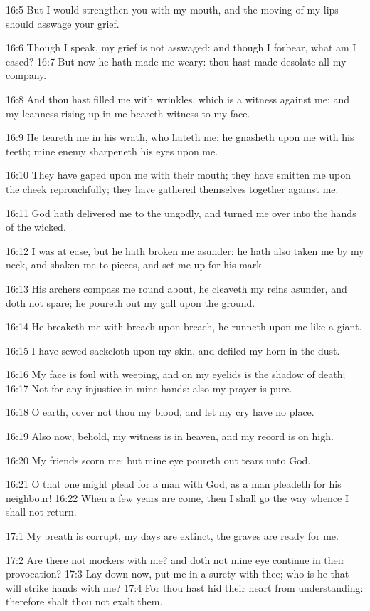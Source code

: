 16:5 But I would strengthen you with my mouth, and the moving of my
lips should asswage your grief.

16:6 Though I speak, my grief is not asswaged: and though I forbear,
what am I eased?  16:7 But now he hath made me weary: thou hast made
desolate all my company.

16:8 And thou hast filled me with wrinkles, which is a witness against
me: and my leanness rising up in me beareth witness to my face.

16:9 He teareth me in his wrath, who hateth me: he gnasheth upon me
with his teeth; mine enemy sharpeneth his eyes upon me.

16:10 They have gaped upon me with their mouth; they have smitten me
upon the cheek reproachfully; they have gathered themselves together
against me.

16:11 God hath delivered me to the ungodly, and turned me over into
the hands of the wicked.

16:12 I was at ease, but he hath broken me asunder: he hath also taken
me by my neck, and shaken me to pieces, and set me up for his mark.

16:13 His archers compass me round about, he cleaveth my reins
asunder, and doth not spare; he poureth out my gall upon the ground.

16:14 He breaketh me with breach upon breach, he runneth upon me like
a giant.

16:15 I have sewed sackcloth upon my skin, and defiled my horn in the
dust.

16:16 My face is foul with weeping, and on my eyelids is the shadow of
death; 16:17 Not for any injustice in mine hands: also my prayer is
pure.

16:18 O earth, cover not thou my blood, and let my cry have no place.

16:19 Also now, behold, my witness is in heaven, and my record is on
high.

16:20 My friends scorn me: but mine eye poureth out tears unto God.

16:21 O that one might plead for a man with God, as a man pleadeth for
his neighbour!  16:22 When a few years are come, then I shall go the
way whence I shall not return.

17:1 My breath is corrupt, my days are extinct, the graves are ready
for me.

17:2 Are there not mockers with me? and doth not mine eye continue in
their provocation?  17:3 Lay down now, put me in a surety with thee;
who is he that will strike hands with me?  17:4 For thou hast hid
their heart from understanding: therefore shalt thou not exalt them.

